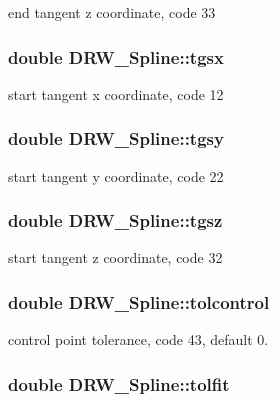 end tangent z coordinate, code 33 \hypertarget{classDRW__Spline_af669678833d9334001f372ef3e459063}{
\subsubsection[{tgsx}]{\setlength{\rightskip}{0pt plus 5cm}double D\-R\-W\-\_\-\-Spline\-::tgsx}}\label{classDRW__Spline_af669678833d9334001f372ef3e459063}
start tangent x coordinate, code 12 \hypertarget{classDRW__Spline_a0d22ecfcfa1ccdf83d3799555b808fb6}{
\subsubsection[{tgsy}]{\setlength{\rightskip}{0pt plus 5cm}double D\-R\-W\-\_\-\-Spline\-::tgsy}}\label{classDRW__Spline_a0d22ecfcfa1ccdf83d3799555b808fb6}
start tangent y coordinate, code 22 \hypertarget{classDRW__Spline_a432ab2ee17f00fe8c3537f3ab12f0524}{
\subsubsection[{tgsz}]{\setlength{\rightskip}{0pt plus 5cm}double D\-R\-W\-\_\-\-Spline\-::tgsz}}\label{classDRW__Spline_a432ab2ee17f00fe8c3537f3ab12f0524}
start tangent z coordinate, code 32 \hypertarget{classDRW__Spline_a9ebcea64002b14f0adfae66eadd9f24a}{
\subsubsection[{tolcontrol}]{\setlength{\rightskip}{0pt plus 5cm}double D\-R\-W\-\_\-\-Spline\-::tolcontrol}}\label{classDRW__Spline_a9ebcea64002b14f0adfae66eadd9f24a}
control point tolerance, code 43, default 0. \hypertarget{classDRW__Spline_a8f91c72942350988a2c3b4652162d613}{
\subsubsection[{tolfit}]{\setlength{\rightskip}{0pt plus 5cm}double D\-R\-W\-\_\-\-Spline\-::tolfit}}\label{classDRW__Spline_a8f91c72942350988a2c3b4652162d613}
